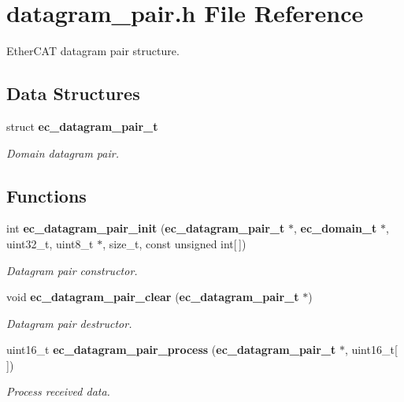 \section{datagram\-\_\-pair.\-h File Reference}
\label{datagram__pair_8h}


Ether\-C\-A\-T datagram pair structure.  


\subsection*{Data Structures}
\begin{DoxyCompactItemize}
\item 
struct {\bf ec\-\_\-datagram\-\_\-pair\-\_\-t}
\begin{DoxyCompactList}\small\item\em Domain datagram pair. \end{DoxyCompactList}\end{DoxyCompactItemize}
\subsection*{Functions}
\begin{DoxyCompactItemize}
\item 
int {\bf ec\-\_\-datagram\-\_\-pair\-\_\-init} ({\bf ec\-\_\-datagram\-\_\-pair\-\_\-t} $\ast$, {\bf ec\-\_\-domain\-\_\-t} $\ast$, uint32\-\_\-t, uint8\-\_\-t $\ast$, size\-\_\-t, const unsigned int[$\,$])
\begin{DoxyCompactList}\small\item\em Datagram pair constructor. \end{DoxyCompactList}\item 
void {\bf ec\-\_\-datagram\-\_\-pair\-\_\-clear} ({\bf ec\-\_\-datagram\-\_\-pair\-\_\-t} $\ast$)\label{datagram__pair_8h_ac3ff7374f362ab7e2990346186202b71}

\begin{DoxyCompactList}\small\item\em Datagram pair destructor. \end{DoxyCompactList}\item 
uint16\-\_\-t {\bf ec\-\_\-datagram\-\_\-pair\-\_\-process} ({\bf ec\-\_\-datagram\-\_\-pair\-\_\-t} $\ast$, uint16\-\_\-t[$\,$])
\begin{DoxyCompactList}\small\item\em Process received data. \end{DoxyCompactList}\end{DoxyCompactItemize}



